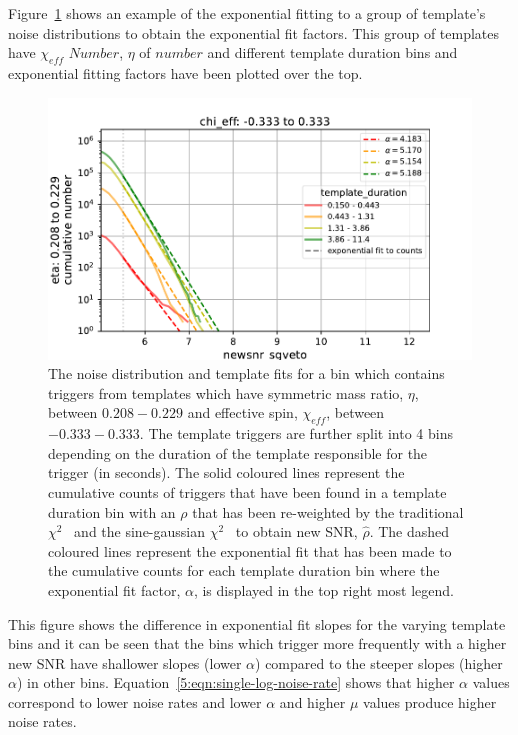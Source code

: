 Figure~\ref{5:fig:template-fits} shows an example of the exponential fitting to a group of template's noise distributions to obtain the exponential fit factors. This group of templates have $\chi_{eff}$ $Number$, $\eta$ of $number$ and different template duration bins and exponential fitting factors have been plotted over the top.
%
\begin{figure}
    \centering
    \includegraphics[width=1.0\textwidth]{images/5_pycbclive/others/fit_plot.pdf}
    \caption{The noise distribution and template fits for a bin which contains triggers from templates which have symmetric mass ratio, $\eta$, between $0.208 - 0.229$ and effective spin, $\chi_{eff}$, between $-0.333 - 0.333$. The template triggers are further split into 4 bins depending on the duration of the template responsible for the trigger (in seconds). The solid coloured lines represent the cumulative counts of triggers that have been found in a template duration bin with an $\rho$ that has been re-weighted by the traditional $\chi^{2}$~\cite{Allen_Chi:2005} and the sine-gaussian $\chi^{2}$~\cite{PyCBC_sg:2018} to obtain new SNR, $\hat{\rho}$. The dashed coloured lines represent the exponential fit that has been made to the cumulative counts for each template duration bin where the exponential fit factor, $\alpha$, is displayed in the top right most legend.}
    \label{5:fig:template-fits}
\end{figure}
%
This figure shows the difference in exponential fit slopes for the varying template bins and it can be seen that the bins which trigger more frequently with a higher new SNR have shallower slopes (lower $\alpha$) compared to the steeper slopes (higher $\alpha$) in other bins. Equation~\ref{5:eqn:single-log-noise-rate} shows that higher $\alpha$ values correspond to lower noise rates and lower $\alpha$ and higher $\mu$ values produce higher noise rates.

